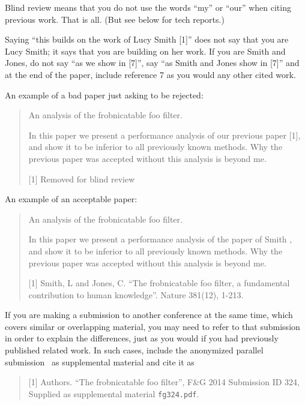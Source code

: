 \documentclass[10pt,twocolumn,letterpaper]{article}
\begin{document}
Blind review means that you do not use the words ``my'' or ``our'' when citing previous work.
That is all.
(But see below for tech reports.)

Saying ``this builds on the work of Lucy Smith [1]'' does not say that you are Lucy Smith;
it says that you are building on her work.
If you are Smith and Jones, do not say ``as we show in [7]'', say ``as Smith and Jones show in [7]'' and at the end of the paper, include reference 7 as you would any other cited work.

An example of a bad paper just asking to be rejected:
\begin{quote}
\begin{center}
    An analysis of the frobnicatable foo filter.
\end{center}

   In this paper we present a performance analysis of our previous paper [1], and show it to be inferior to all previously known methods.
   Why the previous paper was accepted without this analysis is beyond me.

   [1] Removed for blind review
\end{quote}


An example of an acceptable paper:
\begin{quote}
\begin{center}
     An analysis of the frobnicatable foo filter.
\end{center}

   In this paper we present a performance analysis of the  paper of Smith \etal [1], and show it to be inferior to all previously known methods.
   Why the previous paper was accepted without this analysis is beyond me.

   [1] Smith, L and Jones, C. ``The frobnicatable foo filter, a fundamental contribution to human knowledge''. Nature 381(12), 1-213.
\end{quote}

If you are making a submission to another conference at the same time, which covers similar or overlapping material, you may need to refer to that submission in order to explain the differences, just as you would if you had previously published related work.
In such cases, include the anonymized parallel submission~\cite{Authors14} as supplemental material and cite it as
\begin{quote}
[1] Authors. ``The frobnicatable foo filter'', F\&G 2014 Submission ID 324, Supplied as supplemental material {\tt fg324.pdf}.
\end{quote}
\end{document}
